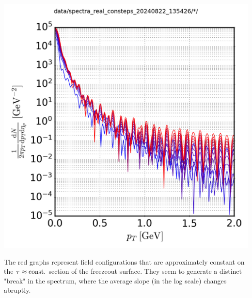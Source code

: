 {\begin{minipage}{\linewidth}
{\begin{minipage}{0.45\linewidth}
                \includegraphics[width=\linewidth]{code/C++/DCCspec/data/images/spectra_real_consteps_20240822_135426_spec.png}        
            \end{minipage}
        }
    \end{minipage}
}
The red graphs represent field configurations that are approximately constant on the ${\tau\approx{\text{const.}}}$ section of the freezeout surface. They seem to generate a distinct "break" in the spectrum, where the average slope (in the log scale) changes abruptly.

